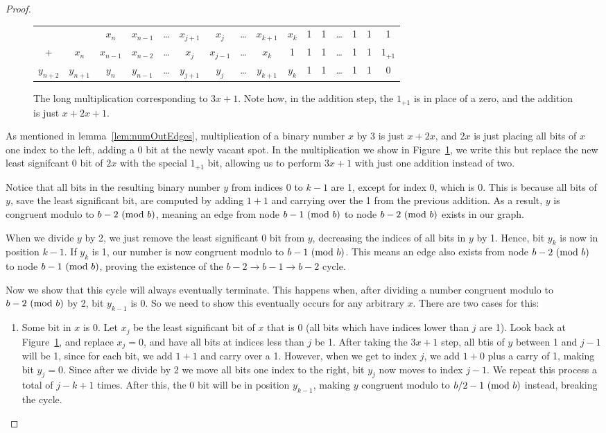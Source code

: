 \begin{proof}
\begin{figure}
\begin{tabular}{*{16}c}
  & & $ x_{n}$  & $ x_{n-1}$  & \ldots & $ x_{j+1}$  & $ x_{j}$  & \ldots & $ x_{k+1}$  & $ x_{k}$  & 1 & 1 & \ldots & 1 & 1 & 1 \\
  + & $ x_{n}$  & $ x_{n-1}$  & $ x_{n-2}$  & \ldots & $ x_{j}$  & $ x_{j-1}$  & \ldots & $ x_{k}$  & 1 & 1 & 1 & \ldots & 1 & 1 & $1_{+1}$  \\
  \hline
  $ y_{n+2}$  & $ y_{n+1}$  & $ y_{n}$  & $ y_{n-1}$  & \ldots & $ y_{j+1}$  & $ y_{j}$  & \ldots & $ y_{k+1}$  & $ y_{k}$  & 1 & 1 & \ldots & 1 & 1 & 0 
\end{tabular}
\caption{The long multiplication corresponding to $3x + 1$. Note how, in the addition step, the $1_{+1}$ is in place of a zero, and the addition is just $x + 2x + 1$.}
\label{fig:mul}
\end{figure}
As mentioned in lemma~\ref{lem:numOutEdges}, multiplication of a binary number $x$ by 3 is just $x + 2x$, and $2x$ is just placing all bits of $x$ one index to the left, adding a 0 bit at the newly vacant spot. In the multiplication we show in Figure~\ref{fig:mul}, we write this but replace the new least signifcant 0 bit of $2x$ with the special $1_{+1}$ bit, allowing us to perform $3x+1$ with just one addition instead of two. \par
Notice that all bits in the resulting binary number $y$ from indices 0 to $k-1$ are 1, except for index 0, which is 0. This is because all bits of $y$, save the least significant bit, are computed by adding $1+1$ and carrying over the 1 from the previous addition. As a result, $y$ is congruent modulo to $b-2 \ (\mathrm{mod}\ b)$, meaning an edge from node $b-1 \ (\mathrm{mod}\ b)$ to node $b-2 \ (\mathrm{mod}\ b)$ exists in our graph.\par
When we divide $y$ by 2, we just remove the least significant 0 bit from $y$, decreasing the indices of all bits in $y$ by 1. Hence, bit $y_k$ is now in position $k-1$. If $y_k$ is 1, our number is now congruent modulo to $b-1 \ (\mathrm{mod}\ b)$. This means an edge also exists from node $b-2 \ (\mathrm{mod}\ b)$ to node $b-1 \ (\mathrm{mod}\ b)$, proving the existence of the $b-2 \rightarrow b-1 \rightarrow b-2$ cycle. \par
Now we show that this cycle will always eventually terminate. This happens when, after dividing a number congruent modulo to $b-2 \ (\mathrm{mod}\ b)$ by 2, bit $y_{k-1}$ is 0. So we need to show this eventually occurs for any arbitrary $x$. There are two cases for this:
\begin{enumerate}
    \item Some bit in $x$ is 0. Let $x_j$ be the least significant bit of $x$ that is 0 (all bits which have indices lower than $j$ are 1). Look back at Figure~\ref{fig:mul}, and replace $x_j = 0$, and have all bits at indices less than $j$ be 1. After taking the $3x+1$ step, all btis of $y$ between 1 and $j-1$ will be 1, since for each bit, we add $1 + 1$ and carry over a 1. However, when we get to index $j$, we add $1 + 0$ plus a carry of 1, making bit $y_j = 0$. Since after we divide by 2 we move all bits one index to the right, bit $y_j$ now moves to index $j-1$. We repeat this process a total of $j-k+1$ times. After this, the 0 bit will be in position $y_{k-1}$, making $y$ congruent modulo to $b/2 - 1 \ (\mathrm{mod}\ b)$ instead, breaking the cycle.

\end{enumerate}
\end{proof}
